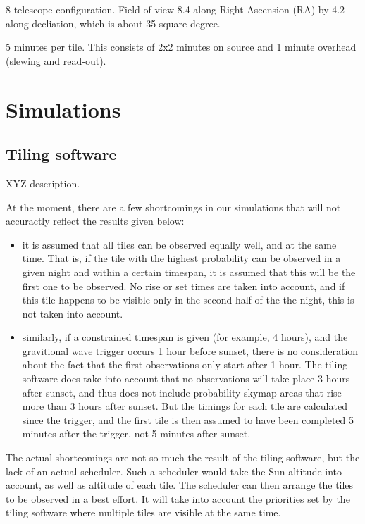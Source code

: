 \documentclass[twocolumn]{article}
\begin{document}
8-telescope configuration. Field of view 8.4 along Right Ascension
(RA) by 4.2 along decliation, which is about 35 square degree.

5 minutes per tile. This consists of 2x2 minutes on source and 1 minute
overhead (slewing and read-out).


\section{Simulations}

\subsection{Tiling software}

XYZ description.


At the moment, there are a few shortcomings in our simulations
that will not accuractly reflect the results given below:

\begin{itemize}
  
\item it is assumed that all tiles can be observed equally well, and at
the same time. That is, if the tile with the highest probability can
be observed in a given night and within a certain timespan, it is
assumed that this will be the first one to be observed. No rise or set
times are taken into account, and if this tile happens to be visible
only in the second half of the the night, this is not taken into
account.

\item similarly, if a constrained timespan is given (for example, 4
hours), and the gravitional wave trigger occurs 1 hour before sunset,
there is no consideration about the fact that the first observations
only start after 1 hour. The tiling software does take into account
that no observations will take place 3 hours after sunset, and thus
does not include probability skymap areas that rise more than 3 hours
after sunset. But the timings for each tile are calculated since the
trigger, and the first tile is then assumed to have been completed 5
minutes after the trigger, not 5 minutes after sunset.

\end{itemize}

The actual shortcomings are not so much the result of the tiling
software, but the lack of an actual scheduler. Such a scheduler would
take the Sun altitude into account, as well as altitude of each tile.
The scheduler can then arrange the tiles to be observed in a best
effort. It will take into account the priorities set by the tiling
software where multiple tiles are visible at the same time.
\end{document}
